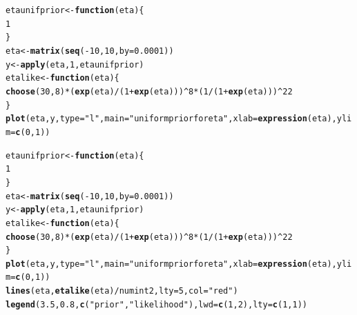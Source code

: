 \documentclass[12pt]{article}\usepackage[]{graphicx}\usepackage[]{color}
\makeatletter
\newcommand{\hlnum}[1]{\textcolor[rgb]{0.686,0.059,0.569}{#1}}%
\newcommand{\hlstr}[1]{\textcolor[rgb]{0.192,0.494,0.8}{#1}}%
\newcommand{\hlopt}[1]{\textcolor[rgb]{0,0,0}{#1}}%
\newcommand{\hlstd}[1]{\textcolor[rgb]{0.345,0.345,0.345}{#1}}%
\newcommand{\hlkwa}[1]{\textcolor[rgb]{0.161,0.373,0.58}{\textbf{#1}}}%
\newcommand{\hlkwb}[1]{\textcolor[rgb]{0.69,0.353,0.396}{#1}}%
\newcommand{\hlkwc}[1]{\textcolor[rgb]{0.333,0.667,0.333}{#1}}%
\newcommand{\hlkwd}[1]{\textcolor[rgb]{0.737,0.353,0.396}{\textbf{#1}}}%
\newenvironment{kframe}{%
 \def\at@end@of@kframe{}%
 \ifinner\ifhmode%
  \def\at@end@of@kframe{\end{minipage}}%
  \begin{minipage}{\columnwidth}%
 \fi\fi%
 \def\FrameCommand##1{\hskip\@totalleftmargin \hskip-\fboxsep
 \colorbox{shadecolor}{##1}\hskip-\fboxsep
     \hskip-\linewidth \hskip-\@totalleftmargin \hskip\columnwidth}%
 \MakeFramed {\advance\hsize-\width
   \@totalleftmargin\z@ \linewidth\hsize
   \@setminipage}}%
 {\par\unskip\endMakeFramed%
 \at@end@of@kframe}
\newenvironment{knitrout}{}{} %
\makeatother
\begin{document}
\begin{knitrout}\footnotesize
{}\color{fgcolor}\begin{kframe}
\begin{alltt}
\hlstd{etaunifprior} \hlkwb{<-} \hlkwa{function}\hlstd{(}\hlkwc{eta}\hlstd{) \{}
  \hlnum{1}
\hlstd{\}}
\hlstd{eta} \hlkwb{<-} \hlkwd{matrix}\hlstd{(}\hlkwd{seq}\hlstd{(}\hlopt{-}\hlnum{10}\hlstd{,} \hlnum{10}\hlstd{,} \hlkwc{by}\hlstd{=}\hlnum{0.0001}\hlstd{))}
\hlstd{y} \hlkwb{<-} \hlkwd{apply}\hlstd{(eta,} \hlnum{1}\hlstd{, etaunifprior)}
\hlstd{etalike} \hlkwb{<-} \hlkwa{function}\hlstd{(}\hlkwc{eta}\hlstd{)\{}
  \hlkwd{choose}\hlstd{(}\hlnum{30}\hlstd{,} \hlnum{8}\hlstd{)}\hlopt{*}\hlstd{(}\hlkwd{exp}\hlstd{(eta)}\hlopt{/}\hlstd{(}\hlnum{1}\hlopt{+}\hlkwd{exp}\hlstd{(eta)))}\hlopt{^}\hlnum{8}\hlopt{*}\hlstd{(}\hlnum{1}\hlopt{/}\hlstd{(}\hlnum{1}\hlopt{+}\hlkwd{exp}\hlstd{(eta)))}\hlopt{^}\hlnum{22}
\hlstd{\}}
\hlkwd{plot}\hlstd{(eta, y,} \hlkwc{type}\hlstd{=}\hlstr{"l"}\hlstd{,} \hlkwc{main}\hlstd{=}\hlstr{"uniform prior for eta"}\hlstd{,} \hlkwc{xlab}\hlstd{=}\hlkwd{expression}\hlstd{(eta),} \hlkwc{ylim}\hlstd{=}\hlkwd{c}\hlstd{(}\hlnum{0}\hlstd{,}\hlnum{1}\hlstd{))}
\end{alltt}
\end{kframe}
\end{knitrout}

\begin{knitrout}\footnotesize
{}\color{fgcolor}\begin{kframe}
\begin{alltt}
\hlstd{etaunifprior} \hlkwb{<-} \hlkwa{function}\hlstd{(}\hlkwc{eta}\hlstd{) \{}
  \hlnum{1}
\hlstd{\}}
\hlstd{eta} \hlkwb{<-} \hlkwd{matrix}\hlstd{(}\hlkwd{seq}\hlstd{(}\hlopt{-}\hlnum{10}\hlstd{,} \hlnum{10}\hlstd{,} \hlkwc{by}\hlstd{=}\hlnum{0.0001}\hlstd{))}
\hlstd{y} \hlkwb{<-} \hlkwd{apply}\hlstd{(eta,} \hlnum{1}\hlstd{, etaunifprior)}
\hlstd{etalike} \hlkwb{<-} \hlkwa{function}\hlstd{(}\hlkwc{eta}\hlstd{)\{}
  \hlkwd{choose}\hlstd{(}\hlnum{30}\hlstd{,} \hlnum{8}\hlstd{)}\hlopt{*}\hlstd{(}\hlkwd{exp}\hlstd{(eta)}\hlopt{/}\hlstd{(}\hlnum{1}\hlopt{+}\hlkwd{exp}\hlstd{(eta)))}\hlopt{^}\hlnum{8}\hlopt{*}\hlstd{(}\hlnum{1}\hlopt{/}\hlstd{(}\hlnum{1}\hlopt{+}\hlkwd{exp}\hlstd{(eta)))}\hlopt{^}\hlnum{22}
\hlstd{\}}
\hlkwd{plot}\hlstd{(eta, y,} \hlkwc{type}\hlstd{=}\hlstr{"l"}\hlstd{,} \hlkwc{main}\hlstd{=}\hlstr{"uniform prior for eta"}\hlstd{,} \hlkwc{xlab}\hlstd{=}\hlkwd{expression}\hlstd{(eta),} \hlkwc{ylim}\hlstd{=}\hlkwd{c}\hlstd{(}\hlnum{0}\hlstd{,}\hlnum{1}\hlstd{))}
\hlkwd{lines}\hlstd{(eta,} \hlkwd{etalike}\hlstd{(eta)}\hlopt{/}\hlstd{numint2,} \hlkwc{lty}\hlstd{=}\hlnum{5}\hlstd{,} \hlkwc{col}\hlstd{=}\hlstr{"red"}\hlstd{)}
\hlkwd{legend}\hlstd{(}\hlnum{3.5}\hlstd{,} \hlnum{0.8}\hlstd{,} \hlkwd{c}\hlstd{(}\hlstr{"prior"}\hlstd{,} \hlstr{"likelihood"}\hlstd{),} \hlkwc{lwd}\hlstd{=}\hlkwd{c}\hlstd{(}\hlnum{1}\hlstd{,}\hlnum{2}\hlstd{),} \hlkwc{lty}\hlstd{=}\hlkwd{c}\hlstd{(}\hlnum{1}\hlstd{,}\hlnum{1}\hlstd{))}
\end{alltt}
\end{kframe}
\end{knitrout}
\end{document}
